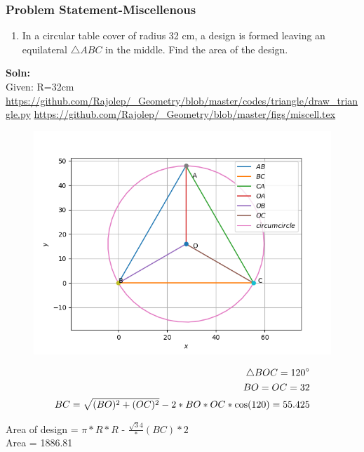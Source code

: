 \begin{frame}
\frametitle{Problem Statement-Miscellenous}
\begin{enumerate}[label=(\roman*)]
\item In a circular table cover of radius 32 cm, a design is formed leaving an equilateral $\triangle{ABC}$
in the middle. Find the area of the design.\\
\end{enumerate}
\textbf{Soln:}\\
  Given: R=32cm\\
\url{https://github.com/Rajolep/_Geometry/blob/master/codes/triangle/draw_triangle.py}
\url{https://github.com/Rajolep/_Geometry/blob/master/figs/miscell.tex}
\begin{figure}

\includegraphics[scale=0.5]{./figs/misc.png}
\end{figure}
\end{frame}
\begin{frame}
\begin{align*}
\triangle{BOC} = 120\degree \\
BO=OC=32\\
BC=\sqrt{(BO)^2+(OC)^2}-2*BO*OC*\cos(120)=55.425\\
\end{align*}

Area of design = $\pi*R*R$ - $\frac{\sqrt{3}{4}}*(BC)*2$\\
Area = 1886.81

\end{frame}